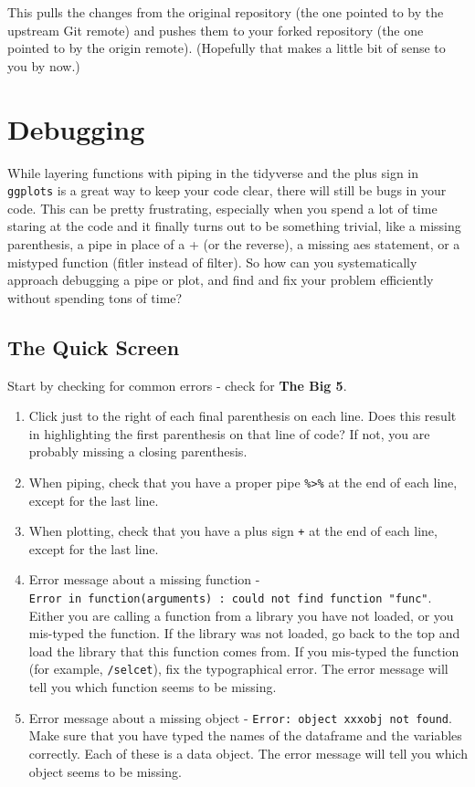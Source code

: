\documentclass[
]{book}
\providecommand{\tightlist}{%
  \setlength{\itemsep}{0pt}\setlength{\parskip}{0pt}}
\begin{document}
This pulls the changes from the original repository (the one pointed to by the upstream Git remote) and pushes them to your forked repository (the one pointed to by the origin remote). (Hopefully that makes a little bit of sense to you by now.)

\hypertarget{debugging}{%
\section{Debugging}\label{debugging}}

While layering functions with piping in the tidyverse
and the plus sign in \texttt{ggplots} is a great way to keep your code clear,
there will still be bugs in your code.
This can be pretty frustrating, especially when you spend a lot of time staring at the code and it finally turns out to be something trivial, like a missing parenthesis, a pipe in place of a + (or the reverse), a missing aes statement, or a mistyped function (fitler instead of filter).
So how can you systematically approach debugging a pipe or plot, and find and fix your problem efficiently without spending tons of time?

\hypertarget{the-quick-screen}{%
\subsection{The Quick Screen}\label{the-quick-screen}}

Start by checking for common errors - check for \textbf{The Big 5}.

\begin{enumerate}
\def\labelenumi{\arabic{enumi}.}
\tightlist
\item
  Click just to the right of each final parenthesis on each line. Does this result in highlighting the first parenthesis on that line of code? If not, you are probably missing a closing parenthesis.
\item
  When piping, check that you have a proper pipe \texttt{\%\textgreater{}\%} at the end of each line, except for the last line.
\item
  When plotting, check that you have a plus sign \texttt{+} at the end of each line, except for the last line.
\item
  Error message about a missing function - \texttt{Error\ in\ function(arguments)\ :\ could\ not\ find\ function\ "func"}. Either you are calling a function from a library you have not loaded, or you mis-typed the function. If the library was not loaded, go back to the top and load the library that this function comes from. If you mis-typed the function (for example, \texttt{/selcet}), fix the typographical error. The error message will tell you which function seems to be missing.
\item
  Error message about a missing object - \texttt{Error:\ object\ \textquotesingle{}xxxobj\textquotesingle{}\ not\ found}. Make sure that you have typed the names of the dataframe and the variables correctly. Each of these is a data object. The error message will tell you which object seems to be missing.
\end{enumerate}
\end{document}
